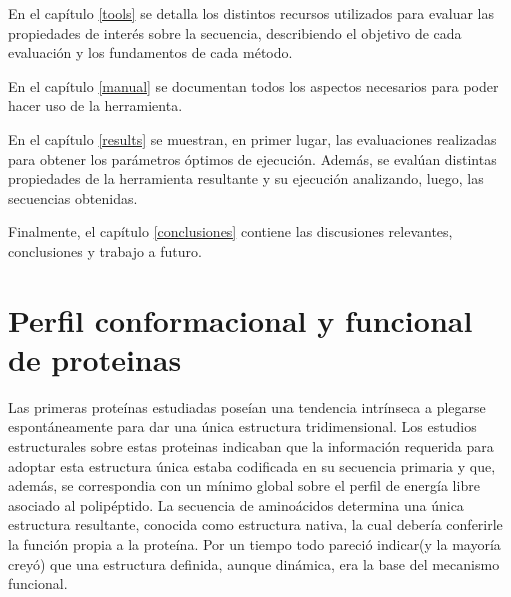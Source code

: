En el capítulo \ref{tools} se detalla los distintos recursos utilizados para evaluar las propiedades de interés sobre la secuencia, describiendo el objetivo de cada evaluación y los fundamentos de cada método. 

En el capítulo \ref{manual} se documentan todos los aspectos necesarios para poder hacer uso de la herramienta.

En el capítulo \ref{results} se muestran, en primer lugar, las evaluaciones realizadas para obtener los parámetros óptimos de ejecución. 
Además, se evalúan distintas propiedades de la herramienta resultante y su ejecución analizando, luego, las secuencias obtenidas. 

Finalmente, el capítulo \ref{conclusiones} contiene las discusiones relevantes, conclusiones y trabajo a futuro.































\section{Perfil conformacional y funcional de proteinas}\label{proteinLandscape}


Las primeras proteínas estudiadas poseían una tendencia intrínseca a plegarse espontáneamente para dar una única estructura tridimensional.
Los estudios estructurales sobre estas proteinas indicaban que la información requerida para adoptar esta estructura única estaba codificada en su secuencia primaria y que, además, se correspondia con un mínimo global sobre el
perfil de energía libre asociado al polipéptido.  
La secuencia de aminoácidos determina una única estructura resultante, conocida como estructura nativa, la cual debería conferirle la función propia a la proteína.
Por un tiempo todo pareció indicar(y la mayoría creyó) que una estructura definida, aunque dinámica, era la base del mecanismo funcional.


